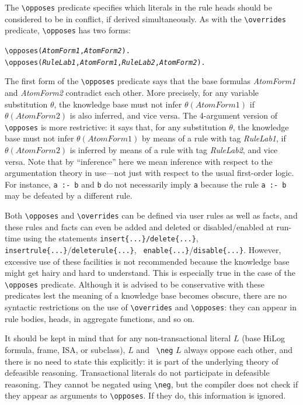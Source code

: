 \documentclass[11pt]{article}
\newcommand{\bs}{\textbackslash}
\newcommand{\RULELOGNEG}{{\texttt{{\bs}neg}}\xspace}
\begin{document}
The {\tt \bs{}opposes} predicate specifies which literals in the rule heads
should be considered to be in conflict, if derived simultaneously. As with the
{\tt \bs{}overrides} predicate, {\tt \bs{}opposes} has two forms:
\index{\bs{}opposes predicate}
\begin{alltt}
  \bs{}opposes({\em{}AtomForm1},\emph{AtomForm2}).
  \bs{}opposes({\em{}RuleLab1},{\em{}AtomForm1},{\em{}RuleLab2},\emph{AtomForm2}).
\end{alltt}
The first form of the {\tt \bs{}opposes} predicate says that the base
formulas \emph{AtomForm1} and \emph{AtomForm2} contradict each other.  More
precisely, for any variable substitution $\theta$, the knowledge
base must not infer $\theta(AtomForm1)$ if $\theta(AtomForm2)$ is also
inferred, and vice versa.  The 4-argument version of {\tt \bs{}opposes} is
more restrictive: it says that, for any substitution $\theta$, the
knowledge base must not infer $\theta(AtomForm1)$ by means of a rule with
tag \emph{RuleLab1}, if $\theta(AtomForm2)$ is inferred by means of a
rule with tag \emph{RuleLab2}, and vice versa.
Note that by ``inference'' here we mean inference with respect to the
argumentation theory in use---not just
with respect to the usual first-order logic. For instance, {\tt a :- b} and
{\tt b} do not necessarily imply {\tt a} because the rule {\tt a :-
  b} may be defeated by a different rule.      

Both {\tt \bs{}opposes} and {\tt \bs{}overrides} can be defined via user rules
as well as facts, and these rules and facts can even be added and deleted
or disabled/enabled
at run-time using the statements {\tt insert\{...\}/delete\{...\}}, {\tt
  insertrule\{...\}}/{\tt deleterule\{...\}}, {\tt
  enable\{...\}}/{\tt disable\{...\}}.
However, excessive use of these facilities
is not recommended because the
knowledge base might get hairy and
hard to understand. This is especially true in the case of
the {\tt \bs{}opposes} predicate.  Although it is advised
to be conservative with these predicates lest the meaning of a knowledge
base becomes obscure, there are no syntactic restrictions on the use of
{\tt \bs{}overrides} and {\tt \bs{}opposes}: they can appear in rule bodies,
heads, in aggregate functions, and so on.  

It should be kept in mind that for any non-transactional literal $L$
(base HiLog formula, frame, ISA, or subclass), $L$ and {\tt
  \RULELOGNEG} $L$ always oppose each other, and there is no need to state this
explicitly: it is part of the underlying theory of defeasible reasoning.
Transactional literals do not participate in defeasible reasoning.
They cannot be negated using {\tt \RULELOGNEG}, but the compiler does not check if
they appear as arguments to {\tt \bs{}opposes}. If they do, this information
is ignored.
\end{document}
